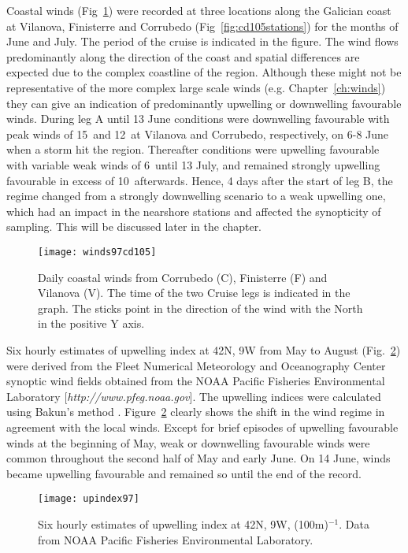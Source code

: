 Coastal winds (Fig~\ref{fig:cd105winds}) were recorded at three
locations along the Galician coast at Vilanova, Finisterre and
Corrubedo (Fig~\ref{fig:cd105stations}) for the months of June and
July. The period of the cruise is indicated in the figure. The
wind flows predominantly along the direction of the coast and
spatial differences are expected due to the complex coastline of
the region. Although these might not be representative of the more
complex large scale winds (e.g. Chapter~\ref{ch:winds}) they can
give an indication of predominantly upwelling or downwelling
favourable winds. During leg A until 13 June conditions were
downwelling favourable with peak winds of 15\vel\, and 12\vel\, at
Vilanova and Corrubedo, respectively, on 6-8 June when a storm hit
the region. Thereafter conditions were upwelling favourable with
variable weak winds of 6\vel\, until 13 July, and remained
strongly upwelling favourable in excess of 10\vel\, afterwards.
Hence, 4 days after the start of leg B, the regime changed from a
strongly downwelling scenario to a weak upwelling one, which had
an impact in the nearshore stations and affected the synopticity
of sampling. This will be discussed later in the chapter.
\begin{figure}[hct]
\centering
\texttt{[image: winds97cd105]}
\caption{Daily coastal winds from Corrubedo (C), Finisterre (F)
and Vilanova (V). The time of the two Cruise legs is indicated in
the graph. The sticks point in the direction of the wind with the
North in the positive Y axis.} \label{fig:cd105winds}
\end{figure}

Six hourly estimates of upwelling index at 42\deg N, 9\deg W from
May to August (Fig.~\ref{fig:cd105upindx}) were derived from the
Fleet Numerical Meteorology and Oceanography Center synoptic wind
fields obtained from the NOAA Pacific Fisheries Environmental
Laboratory [{\it http://www.pfeg.noaa.gov}]. The upwelling indices
were calculated using Bakun's method \citep{Bakun73}.
Figure~\ref{fig:cd105upindx} clearly shows the shift in the wind
regime in agreement with the local winds. Except for brief
episodes of upwelling favourable winds at the beginning of May,
weak or downwelling favourable winds were common throughout the
second half of May and early June. On 14 June, winds became
upwelling favourable and remained so until the end of the record.
\begin{figure}[hct]
\centering
\texttt{[image: upindex97]}
\caption{Six hourly estimates of upwelling index at 42\deg N,
9\deg W, \tra(100m)$^{-1}$. Data from NOAA Pacific Fisheries
Environmental Laboratory. } \label{fig:cd105upindx}
\end{figure}

